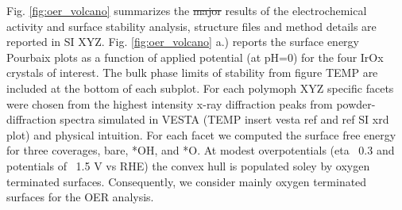 Fig. \ref{fig:oer_volcano} summarizes the \sout{major} results of the electrochemical activity and surface stability analysis, structure files and method details are reported in SI XYZ.
%
Fig. \ref{fig:oer_volcano} a.) reports the surface energy Pourbaix plots as a function of applied potential (at pH=0) for the four IrOx crystals of interest.
%
The bulk phase limits of stability from figure TEMP are included at the bottom of each subplot.
%
For each polymoph XYZ specific facets were chosen from the highest intensity x-ray diffraction peaks from powder-diffraction spectra simulated in VESTA (TEMP insert vesta ref and ref SI xrd plot) and physical intuition.
%
For each facet we computed the surface free energy for three coverages, bare, *OH, and *O.
%
At modest overpotentials (eta ~0.3 and potentials of ~1.5 V vs RHE) the convex hull is populated soley by oxygen terminated surfaces.
%
Consequently, we consider mainly oxygen terminated surfaces for the OER analysis.
%

